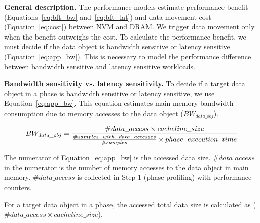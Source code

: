 \textbf{General description.}
The performance models estimate performance benefit (Equations~\ref{eq:bft_bw} and~\ref{eq:bft_lat})
and data movement cost (Equation~\ref{eq:cost}) between NVM and DRAM. We trigger data movement only when the benefit outweighs the cost. 
To calculate the performance benefit, we must decide if the data object is bandwidth sensitive or latency sensitive (Equation~\ref{eq:app_bw}).
This is necessary to model the performance difference between 
bandwidth sensitive and latency sensitive workloads.

\begin{comment}
In particular, if the data object is bandwidth sensitive, the performance benefit is formulated in Equation~\ref{eq:bft_bw};
if the data object is latency sensitive, the performance benefit
is formulated in Equation~\ref{eq:bft_lat}.
\end{comment}

\textbf{Bandwidth sensitivity vs. latency sensitivity.}
To decide if a target data object in a phase is bandwidth sensitive or latency sensitive, we use Equation~\ref{eq:app_bw}. This equation estimates main memory bandwidth consumption due to memory accesses to the data object ($BW_{data\_obj}$). 

\begin{equation}
\label{eq:app_bw}
\scriptsize
BW_{data\_obj} = \frac{\#data\_access \times cacheline\_size}{\frac{\#samples\_with\_data\_accesses}{\#samples} \times phase\_execution\_time}
\end{equation}

The numerator of Equation~\ref{eq:app_bw} is the accessed data size.
$\#data\_access$ in the numerator is the number of memory accesses to the data object in main memory.
$\#data\_access$ is collected in Step 1 (phase profiling) with performance counters.
\begin{comment}
In Step 1, we use a sampling-based approach to collect performance events.
This means that we periodically examine the last cache miss. Hence, in the two equations, $\#data\_access$ is weighted by 
$\#samples$ 
the total number of samples in a 

($\#data\_access \times \#samples$).
$\#samples$ is calculated by $phase\_execution\_time$ divided by $sampling\_interval$.
$phase\_\\execution\_time$ is measured in the profiling iteration.
\end{comment}
For a target data object in a phase, the accessed total data size is
calculated as ($\#data\_access \times cacheline\_size$).

